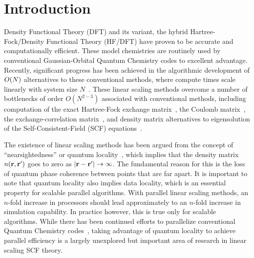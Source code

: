 \commentoutA{\documentclass[prl,aps,twocolumn,showpacs,twocolumngrid,superbib]{revtex4}}
\begin{document}


\maketitle


\section{Introduction}
\label{sec:intro}
Density Functional Theory (DFT) and its variant, the hybrid
Hartree-Fock/Density Functional Theory (HF/DFT) have proven to be
accurate and computationally efficient.  These model chemistries are
routinely used by conventional Gaussian-Orbital Quantum Chemistry
codes to excellent advantage.  Recently, significant progress has been
achieved in the algorithmic development of ${\cal }O(N)$ alternatives
to these conventional methods, where compute times scale linearly with
system size $N$~\cite{Goedecker99,SWu02}.  These linear scaling methods
overcome a number of bottlenecks of order $O(N^{2-3})$ associated with
conventional methods, including computation of the exact Hartree-Fock
exchange matrix~\cite{ESchwegler96,ESchwegler97,ESchwegler98A,ESchwegler98C,ESchwegler99,ESchwegler00}, 
the Coulomb
matrix~\cite{CWhite94B,CWhite96A,MChallacombe96,MChallacombe96B,MStrain96,MChallacombe97},
the exchange-correlation
matrix~\cite{Jorda95,RStratmann96,CGuerra98,MChallacombe00A}, and
density matrix alternatives to eigensolution of the
Self-Consistent-Field (SCF) equations~\cite{XLi93,MDaw93,SQiu94,EHernandez95B,Hernandez96,CMGoringe97,ADaniels97,DBowler99B,APalser98,MChallacombe99,ANiklasson02A,ANiklasson03}.

The existence of linear scaling methods has been argued from the
concept of ``nearsightedness'' or quantum
locality~\cite{WKohn95,WKohn96}, which implies that the density matrix
$n({\bf r},{\bf r'})$ goes to zero as $|{\bf r}-{\bf r}'| \rightarrow
\infty$. The fundamental reason for this is the loss of quantum phase
coherence between points that are far apart.  It is important to note
that quantum locality also implies data locality, which is an
essential property for scalable parallel algorithms.  With parallel
linear scaling methods, an $n$-fold increase in processors should lead
approximately to an $n$-fold increase in simulation capability.  In
practice however, this is true only for scalable algorithms.  While
there has been continued efforts to parallelize conventional Quantum
Chemistry codes~\cite{Harrison_94v45,Guerra_95,Sosa_98v19,Stephan_98v108,Furlani_00v128,Sosa_00v26,Yoshihiro_01v346,Baker_02v23,HTakashima02},
taking advantage of quantum locality to achieve parallel efficiency is
a largely unexplored but important area of research in linear scaling
SCF theory.
\end{document}
